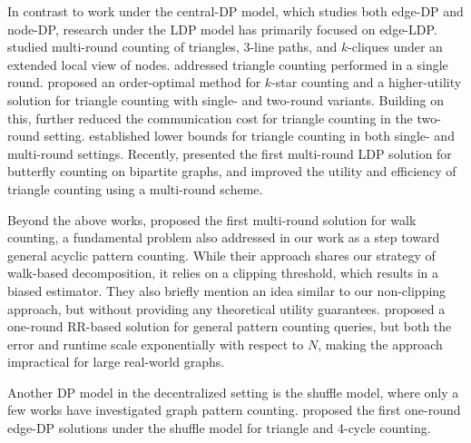 
In contrast to work under the central-DP model, which studies both edge-DP and node-DP, research under the LDP model has primarily focused on edge-LDP.
\citet{sun2019analyzing} studied multi-round counting of triangles, $3$-line paths, and $k$-cliques under an extended local view of nodes. 
\citet{ye2020towards,ye2020lf} addressed triangle counting performed in a single round. 
\citet{Imola2021} proposed an order-optimal method for $k$-star counting and a higher-utility solution for triangle counting with single- and two-round variants. 
Building on this, \citet{Imola2022} further reduced the communication cost for triangle counting in the two-round setting. 
\citet{eden2023triangle} established lower bounds for triangle counting in both single- and multi-round settings.
Recently, \citet{he2024butterfly} presented the first multi-round LDP solution for butterfly counting on bipartite graphs, and \citet{he2025robust} improved the utility and efficiency of triangle counting using a multi-round scheme.


{Beyond the above works, \citet{betzer2024publishing} proposed the first multi-round solution for walk counting, a fundamental problem also addressed in our work as a step toward general acyclic pattern counting. 
While their approach shares our strategy of walk-based decomposition, it relies on a clipping threshold, which results in a biased estimator. 
They also briefly mention an idea similar to our non-clipping approach, but without providing any theoretical utility guarantees.}
{\citet{suppakitpaisarn2025counting} proposed a one-round RR-based solution for general pattern counting queries, but both the error and runtime scale exponentially with respect to $N$, making the approach impractical for large real-world graphs.
}




Another DP model in the decentralized setting is the shuffle model, where only a few works have investigated graph pattern counting. \citet{imola2022differentially} proposed the first one-round edge-DP solutions under the shuffle model for triangle and 4-cycle counting.
